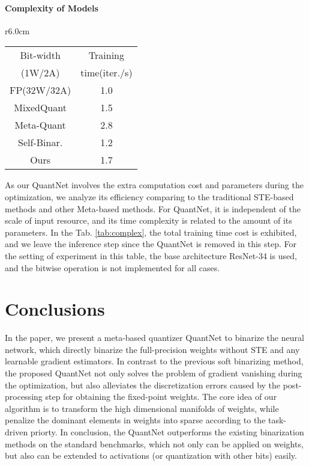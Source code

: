 \documentclass[runningheads]{llncs}
\begin{document}
\paragraph{\textbf{Complexity of Models}}
\begin{wraptable}{r}{6.0cm}
	\centering
    \begin{tabular}{cc}
    \hline
    Bit-width          &    Training        \\
    (1W/2A)            &  time(iter./s)     \\
    \hline
    FP(32W/32A)                          & 1.0       \\
    MixedQuant   \cite{Uhlich2019DQ}     & 1.5      \\
    Meta-Quant   \cite{chen2019meta}     & 2.8      \\
    Self-Binar.  \cite{lahoud2019self}   & 1.2      \\
    Ours                                 & 1.7      \\
    \hline
	\end{tabular}
    \caption{Training time on ResNet-34}
    \label{tab:complex}
\end{wraptable}

As our QuantNet involves the extra computation cost and parameters during the optimization,
we analyze its efficiency comparing to the traditional STE-based methods and other Meta-based methods.
For QuantNet, it is independent of the scale of input resource,
and its time complexity is related to the amount of its parameters.
In the Tab. \ref{tab:complex}, the total training time cost is exhibited,
and we leave the inference step since the QuantNet is removed in this step.
For the setting of experiment in this table, the base architecture ResNet-34 is used,
and the bitwise operation is not implemented for all cases.

\section{Conclusions}
In the paper, we present a meta-based quantizer QuantNet to binarize the neural network,
which directly binarize the full-precision weights without STE and any learnable gradient estimators.
In contrast to the previous soft binarizing method,
the proposed QuantNet not only solves the problem of gradient vanishing during the optimization,
but also alleviates the discretization errors caused by the post-processing step for obtaining the fixed-point weights.
The core idea of our algorithm is to transform the high dimensional manifolds of weights,
while penalize the dominant elements in weights into sparse according to the task-driven priorty.
In conclusion, the QuantNet outperforms the existing binarization methods on the standard benchmarks,
which not only can be applied on weights, but also can be extended to activations (or quantization with other bits) easily.



\end{document}
